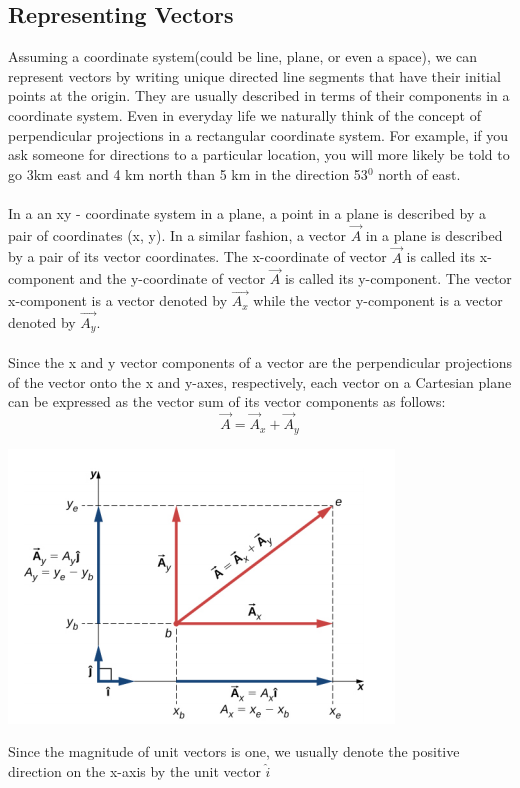\documentclass[9pt]{exam}
\begin{document}
\subsection*{Representing Vectors}
Assuming a coordinate system(could be  line, plane, or even a space), we can represent vectors by writing unique directed line segments that have their initial points at the origin. They are usually described in terms of their components in a coordinate system. Even in everyday life we naturally think of the concept of perpendicular projections in a rectangular coordinate system. For example, if you ask someone for directions to a particular location, you will more likely be told to go 3km east and 4 km north than 5 km in the direction 53$^0$ north of east.\\ \\
In a an xy - coordinate system in a plane, a point in a plane is described by a pair of coordinates (x, y). In a similar fashion, a vector  $\vec{A}$ in a plane is described by a pair of its vector coordinates. The x-coordinate of vector  $\vec{A}$ is called its x-component and the y-coordinate of vector  $\vec{A}$ is called its y-component. The vector x-component is a vector denoted by  $\vec{A_x}$ while the vector y-component is a vector denoted by  $\vec{A_y}$. \\ \\
Since the x and y vector components of a vector are the perpendicular projections of the vector onto the  x and  y-axes, respectively, each vector on a Cartesian plane can be expressed as the vector sum of its vector components as follows:
$$\vec{A} = \vec{A}_{x} + \vec{A}_{y} $$
\begin{center}
	\includegraphics[scale=0.5]{cartesian_plane}
\end{center}
Since the magnitude of unit vectors is one, we usually denote the positive direction on the x-axis by the unit vector  $\hat{i}$
\end{document}
